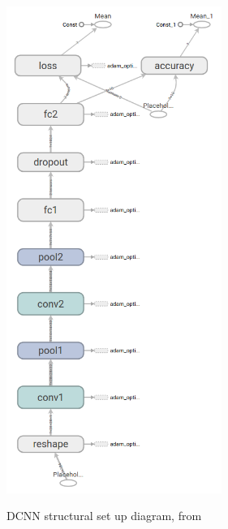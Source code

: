 \begin{figure}
  \centering
  \includegraphics[width=7cm]{DCNN}\\
  \caption{DCNN structural set up diagram, from \citet{Tensor}}
  \label{fig:DCNN}
\end{figure}